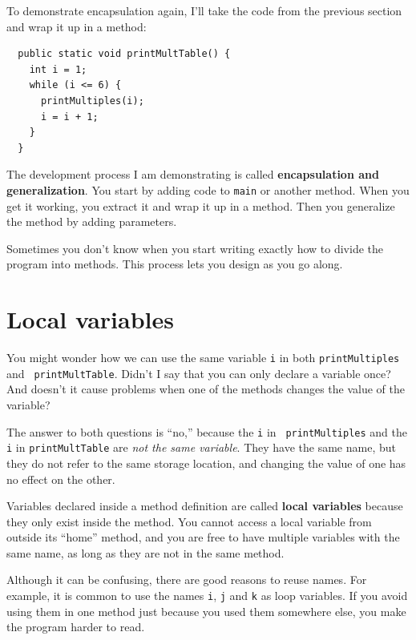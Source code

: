 To demonstrate encapsulation again, I'll take the code
from the previous section and wrap it up in a method:

\begin{lstlisting}
  public static void printMultTable() {
    int i = 1;
    while (i <= 6) {
      printMultiples(i);
      i = i + 1;
    }
  }
\end{lstlisting}
%
The development process I am demonstrating is called
{\bf encapsulation and generalization}.
You start by adding
code to {\tt main} or another method.  When you get
it working, you extract it and wrap it up in a method.
Then you generalize the method by adding parameters.

Sometimes you don't know
when you start writing exactly how to divide the program into
methods.  This process lets you design as you go along.


\section{Local variables}

You might wonder how we can use the same
variable {\tt i} in both {\tt printMultiples} and {\tt
printMultTable}.  Didn't I say that you can only declare a variable
once?  And doesn't it cause problems when one of the methods changes
the value of the variable?

The answer to both questions is ``no,'' because the {\tt i} in {\tt
printMultiples} and the {\tt i} in {\tt printMultTable} are
{\em not the same variable}.  They have the same name, but
they do not refer to the same storage location, and changing
the value of one has no effect on the other.

Variables declared inside a method definition are
called {\bf local variables} because they only exist inside
the method.  You cannot access a local variable from outside
its ``home'' method, and you are free to have multiple
variables with the same name, as long as they are not in
the same method.

Although it can be confusing, there are good
reasons to reuse names.  For example, it is common to
use the names {\tt i}, {\tt j} and {\tt k} as loop variables.
If you avoid using them in one method just because you
used them somewhere else, you make the program
harder to read.


